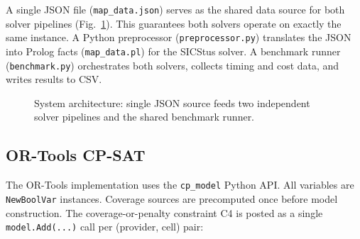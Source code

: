 \documentclass{llncs}
\begin{document}
A single JSON file (\texttt{map\_data.json}) serves as the shared data source
for both solver pipelines (Fig.~\ref{fig:arch}). This guarantees both solvers
operate on exactly the same instance. A Python preprocessor
(\texttt{preprocessor.py}) translates the JSON into Prolog facts
(\texttt{map\_data.pl}) for the SICStus solver. A benchmark runner
(\texttt{benchmark.py}) orchestrates both solvers, collects timing and cost
data, and writes results to CSV.

\begin{figure}[H]
\centering
{}
\caption{System architecture: single JSON source feeds two independent solver
  pipelines and the shared benchmark runner.}
\label{fig:arch}
\end{figure}

\subsection{OR-Tools CP-SAT}

The OR-Tools implementation uses the \texttt{cp\_model} Python API.
All variables are \texttt{NewBoolVar} instances. Coverage sources are
precomputed once before model construction. The coverage-or-penalty constraint
C4 is posted as a single \texttt{model.Add(...)} call per (provider, cell) pair:
\end{document}
